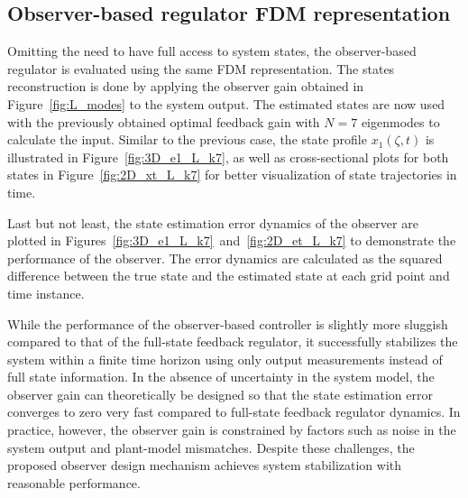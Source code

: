 \subsection{Observer-based regulator FDM representation}

Omitting the need to have full access to system states, the observer-based regulator is evaluated using the same FDM representation. The states reconstruction is done by applying the observer gain obtained in Figure~\ref{fig:L_modes} to the system output. The estimated states are now used with the previously obtained optimal feedback gain with $N=7$ eigenmodes to calculate the input. Similar to the previous case, the state profile $x_1(\zeta,t)$ is illustrated in Figure~\ref{fig:3D_e1_L_k7}, as well as cross-sectional plots for both states in Figure~\ref{fig:2D_xt_L_k7} for better visualization of state trajectories in time.

Last but not least, the state estimation error dynamics of the observer are plotted in Figures~\ref{fig:3D_e1_L_k7}~and~\ref{fig:2D_et_L_k7} to demonstrate the performance of the observer. The error dynamics are calculated as the squared difference between the true state and the estimated state at each grid point and time instance.

While the performance of the observer-based controller is slightly more sluggish compared to that of the full-state feedback regulator, it successfully stabilizes the system within a finite time horizon using only output measurements instead of full state information. In the absence of uncertainty in the system model, the observer gain can theoretically be designed so that the state estimation error converges to zero very fast compared to full-state feedback regulator dynamics. In practice, however, the observer gain is constrained by factors such as noise in the system output and plant-model mismatches. Despite these challenges, the proposed observer design mechanism achieves system stabilization with reasonable performance.